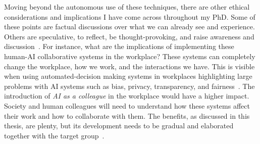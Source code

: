 


Moving beyond the autonomous use of these techniques, there are other ethical considerations and implications I have come across throughout my PhD. Some of these points are factual discussions over what we can already see and experience. Others are speculative, to reflect, be thought-provoking, and raise awareness and discussion~\cite{fiesler_innovating_2021,klassen_run_2022}. For instance, what are the implications of implementing these human-AI collaborative systems in the workplace? These systems can completely change the workplace, how we work, and the interactions we have. This is visible when using automated-decision making systems in workplaces highlighting large problems with AI systems such as bias, privacy, transparency, and fairness~\cite{lepri_ethical_2021}. The introduction of \emph{AI as a colleague} in the workplace would have a higher impact. Society and human colleagues will need to understand how these systems affect their work and how to collaborate with them. The benefits, as discussed in this thesis, are plenty, but its development needs to be gradual and elaborated together with the target group~\cite{lai_towards_2020,partlan_design-driven_2021}.

